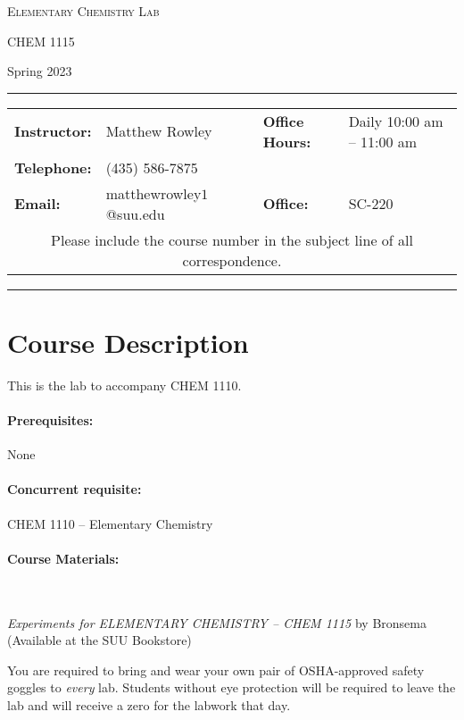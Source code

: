 \documentclass[12pt, letterpaper]{article}
\begin{document}
\begin{center}
	{\Large \textsc{Elementary Chemistry Lab}}

	CHEM 1115
\end{center}

\begin{center}
	{\large Spring 2023}
\end{center}
\begin{center}
	\rule{0.99\textwidth}{0.4pt}
	\begin{tabular}{llcll}
		\textbf{Instructor:} & Matthew Rowley           &  & \textbf{Office Hours:} & Daily 10:00 am -- 11:00 am \\
		\textbf{Telephone:}  & (435) 586-7875           &  &                        &                            \\
		\textbf{Email:}      & matthewrowley$1$@suu.edu &  & \textbf{Office:}       & SC-220                     \\
		\multicolumn{5}{c}{Please include the course number in the subject line of all correspondence.}
	\end{tabular}
	\rule{0.99\textwidth}{0.4pt}
\end{center}

\section*{Course Description}
This is the lab to accompany CHEM 1110.

\paragraph{Prerequisites:}
None

\paragraph{Concurrent requisite:}
CHEM 1110 -- Elementary Chemistry

\paragraph{Course Materials:} ~

\emph{Experiments for ELEMENTARY CHEMISTRY -- CHEM 1115} by Bronsema (Available at the SUU Bookstore)

You are required to bring and wear your own pair of OSHA-approved safety goggles to \emph{every} lab. Students without eye protection will be required to leave the lab and will receive a zero for the labwork that day.
\end{document}
